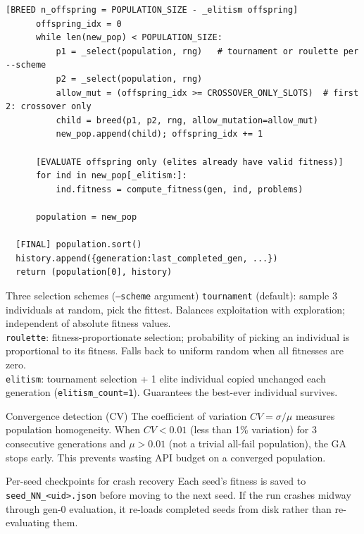 \documentclass[11pt,a4paper]{report}
\newcommand{\fn}[1]{\texttt{#1}}
\begin{document}
\begin{lstlisting}[style=chain]
      [BREED n_offspring = POPULATION_SIZE - _elitism offspring]
      offspring_idx = 0
      while len(new_pop) < POPULATION_SIZE:
          p1 = _select(population, rng)   # tournament or roulette per --scheme
          p2 = _select(population, rng)
          allow_mut = (offspring_idx >= CROSSOVER_ONLY_SLOTS)  # first 2: crossover only
          child = breed(p1, p2, rng, allow_mutation=allow_mut)
          new_pop.append(child); offspring_idx += 1

      [EVALUATE offspring only (elites already have valid fitness)]
      for ind in new_pop[_elitism:]:
          ind.fitness = compute_fitness(gen, ind, problems)

      population = new_pop

  [FINAL] population.sort()
  history.append({generation:last_completed_gen, ...})
  return (population[0], history)
\end{lstlisting}

\begin{concept}{Three selection schemes (\fn{--scheme} argument)}
\fn{tournament} (default): sample 3 individuals at random, pick the fittest.
Balances exploitation with exploration; independent of absolute fitness values.\\
\fn{roulette}: fitness-proportionate selection; probability of picking an individual
is proportional to its fitness.  Falls back to uniform random when all fitnesses
are zero.\\
\fn{elitism}: tournament selection + 1 elite individual copied unchanged each
generation (\fn{elitism\_count=1}).  Guarantees the best-ever individual survives.
\end{concept}

\begin{concept}{Convergence detection (CV)}
The coefficient of variation $CV = \sigma / \mu$ measures population homogeneity.
When $CV < 0.01$ (less than 1\% variation) for 3 consecutive generations and
$\mu > 0.01$ (not a trivial all-fail population), the GA stops early.
This prevents wasting API budget on a converged population.
\end{concept}

\begin{concept}{Per-seed checkpoints for crash recovery}
Each seed's fitness is saved to \fn{seed\_NN\_\textless uid\textgreater.json} before
moving to the next seed.  If the run crashes midway through gen-0 evaluation, it
re-loads completed seeds from disk rather than re-evaluating them.
\end{concept}
\end{document}

